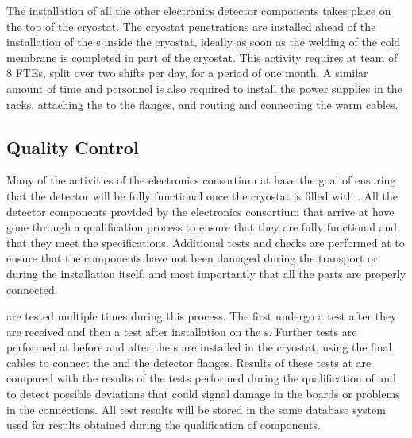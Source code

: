 The installation of all the other  electronics detector components
takes place on the top of the cryostat. The cryostat penetrations are installed
ahead of the installation of the s inside the cryostat, ideally as
soon as the welding of the cold membrane is completed in part of the cryostat. 
This activity requires at team of 8 FTEs, split over two shifts per day, for a 
period of one month. A similar amount of time and personnel is also required
to install the power supplies in the racks, attaching the  to
the  flanges, and routing and connecting the warm cables.

\subsection{Quality Control}
\label{sec:fdsp-tpcelec-integration-qc}

Many of the activities of the  electronics
consortium at  have the goal of 
ensuring that the detector will be fully functional once the cryostat
is filled with . All the detector components provided
by the  electronics consortium that arrive 
at  have gone through a qualification process to ensure
that they are fully functional and that they meet the  
specifications. Additional tests and checks are performed at 
to ensure that the components have not
been damaged during the transport or during the installation itself,
and most importantly that all the parts are properly connected.

 are tested multiple times during this process. 
The  first undergo a test after they are received and then a test after 
installation on the s. Further 
tests are performed at  before and after the 
s are installed in the cryostat, using the final cables to connect the  and the detector flanges. 
Results of these tests at  are compared with the results of the
tests performed during the qualification of  and
 to detect possible deviations that could signal 
damage in the boards or problems in the connections. All test 
results will be stored in the same database system used for
results obtained during the qualification of components.

